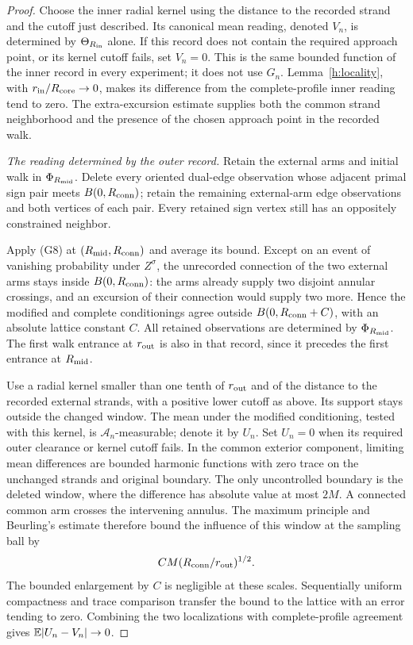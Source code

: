 \begin{proof}
Choose the inner radial kernel using the distance to the recorded
strand and the cutoff just described. Its canonical mean reading,
denoted $V_n$, is determined by $\Theta_{R_{\rm in}}$ alone.
If this record does not contain the required approach point, or its
kernel cutoff fails, set $V_n=0$. This is the same bounded function
of the inner record in every experiment; it does not use $G_n$.
Lemma~\ref{h:locality}, with
$r_{\rm in}/R_{\rm core}\to0$, makes its difference from the
complete-profile inner reading tend to zero. The extra-excursion
estimate supplies both the common strand neighborhood and the
presence of the chosen approach point in the recorded walk.

\emph{The reading determined by the outer record.}
Retain the external arms and initial walk in $\Phi_{R_{\rm mid}}$.
Delete every oriented dual-edge observation whose adjacent primal
sign pair meets $B(0,R_{\rm conn})$; retain the remaining external-arm
edge observations and both vertices of each pair. Every retained sign
vertex still has an oppositely constrained neighbor.

Apply (G8) at $(R_{\rm mid},R_{\rm conn})$ and average its bound.
Except on an event of vanishing probability under $Z^\sigma$, the
unrecorded connection of the two external arms stays inside
$B(0,R_{\rm conn})$: the arms already supply two disjoint annular
crossings, and an excursion of their connection would supply two more.
Hence the modified and complete conditionings agree outside
$B(0,R_{\rm conn}+C)$, with an absolute lattice constant $C$.
All retained observations are determined by $\Phi_{R_{\rm mid}}$.
The first walk entrance at $r_{\rm out}$ is also in that record,
since it precedes the first entrance at $R_{\rm mid}$.

Use a radial kernel smaller than one tenth of $r_{\rm out}$ and
of the distance to the recorded external strands, with a positive
lower cutoff as above. Its support stays outside the changed window.
The mean under the modified conditioning, tested with this kernel,
is $\mathcal A_n$-measurable; denote it by $U_n$. Set $U_n=0$
when its required outer clearance or kernel cutoff fails.
In the common exterior component, limiting mean differences are bounded
harmonic functions with zero trace on the unchanged strands and original
boundary. The only uncontrolled boundary is the deleted window, where
the difference has absolute value at most $2M$. A connected common arm
crosses the intervening annulus. The maximum principle and Beurling's
estimate therefore bound the influence of this window at the sampling
ball by
\[
 C M(R_{\rm conn}/r_{\rm out})^{1/2}.
\]
The bounded enlargement by $C$ is negligible at these scales.
Sequentially uniform compactness and trace comparison transfer the
bound to the lattice with an error tending to zero. Combining the two
localizations with complete-profile agreement gives
$\mathbb E|U_n-V_n|\to0$.


\end{proof}
